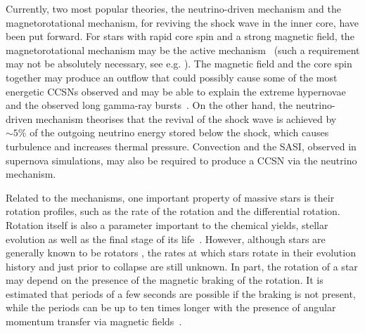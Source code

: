 \documentclass[aps,twocolumn,showpacs,groupedaddress, nofootinbib]{revtex4}  %
\begin{document}
Currently, two most popular theories, the neutrino-driven mechanism \cite{bethe1985revival, bethe1990supernova} and the magnetorotational mechanism,
for reviving the shock wave in the inner core, have been put forward.
For stars with rapid core spin and a strong magnetic field,
the magnetorotational mechanism may be the active mechanism~\cite{leblanc1970numerical, burrows2007simulations, 
takiwaki2009special, moiseenko2006magnetorotational,mosta2014magnetorotational} 
(such a requirement may not be absolutely necessary, see e.g. \cite{obergaulinger2019magnetorotational}). 
The magnetic field and the core spin together may
produce an outflow that could possibly cause some of the most energetic \acp{CCSN} observed and may be able to explain the extreme hypernovae and the observed long gamma-ray
bursts~\cite{woosley2006progenitor, yoon2005evolution, de2013rotation, obergaulinger2017protomagnetar}.
On the other hand, the neutrino-driven mechanism\cite{bethe1985revival, bethe1990supernova} theorises that the revival of the shock wave is achieved by $\sim5\%$
of the outgoing neutrino energy stored below the shock, which causes turbulence and increases thermal pressure.
Convection and the \ac{SASI}\cite{blondin2003stability}, observed  in supernova simulations, may also be required to produce a \ac{CCSN} via the neutrino mechanism.  %

Related to the mechanisms, one important property of massive stars is their rotation profiles, such as the rate of the rotation and the differential rotation.  
Rotation itself is also a parameter important to the chemical yields, stellar evolution as well as the final stage of its life~\cite{langer2012presupernova}.
However,  although stars are generally known to be rotators \cite{ramirez2014rotational}, the rates at which stars rotate 
in their evolution history and just prior to collapse are still unknown.
In part, the rotation of a star may depend on the presence of the magnetic braking of the rotation. 
It is estimated that periods of a few seconds are possible if the braking is not present, 
while the periods can be up to ten times longer with the presence of angular momentum transfer via magnetic
fields~\cite{maeder2012rotating}. 
\end{document}
